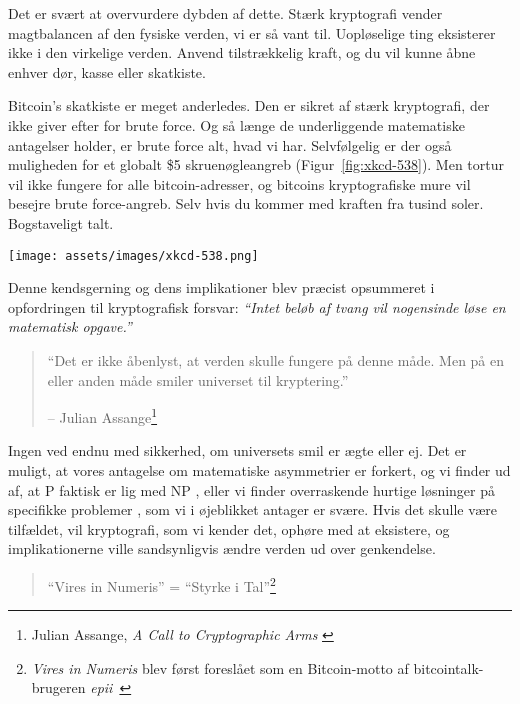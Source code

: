   
  Det er svært at overvurdere dybden af dette. Stærk kryptografi
  vender magtbalancen af den fysiske verden, vi er så vant til.
  Uopløselige ting eksisterer ikke i den virkelige verden. Anvend tilstrækkelig kraft,
  og du vil kunne åbne enhver dør, kasse eller skatkiste.
  
  Bitcoin's skatkiste er meget anderledes. Den er sikret af stærk
  kryptografi, der ikke giver efter for brute force. Og så længe de
  underliggende matematiske antagelser holder, er brute force alt, hvad vi har.
  Selvfølgelig er der også muligheden for et globalt \$5 skruenøgleangreb (Figur~\ref{fig:xkcd-538}).
  Men tortur vil ikke fungere for alle bitcoin-adresser, og bitcoins kryptografiske
  mure vil besejre brute force-angreb. Selv hvis du kommer med kraften fra tusind soler. Bogstaveligt talt.

\begin{center}
  \centering
  \texttt{[image: assets/images/xkcd-538.png]}
  \label{fig:xkcd-538}
\end{center}

Denne kendsgerning og dens implikationer blev præcist opsummeret i opfordringen
til kryptografisk forsvar: \textit{\enquote{Intet beløb af tvang vil nogensinde løse
en matematisk opgave.}}

\begin{quotation}\begin{samepage}
\enquote{Det er ikke åbenlyst, at verden skulle fungere på denne måde. Men på en eller anden måde smiler universet til kryptering.}
\begin{flushright} -- Julian Assange\footnote{Julian Assange, \textit{A Call to Cryptographic Arms} \cite{call-to-cryptographic-arms}}
\end{flushright}\end{samepage}\end{quotation}

Ingen ved endnu med sikkerhed, om universets smil er ægte eller ej. Det
er muligt, at vores antagelse om matematiske asymmetrier er forkert, og
vi finder ud af, at P faktisk er lig med NP \cite{wiki:pnp}, eller vi finder overraskende hurtige
løsninger på specifikke problemer \cite{wiki:discrete-log}, som vi i øjeblikket antager er svære.
Hvis det skulle være tilfældet, vil kryptografi, som vi kender det, ophøre med at
eksistere, og implikationerne ville sandsynligvis ændre verden ud over
genkendelse.

\begin{quotation}\begin{samepage}
\enquote{Vires in Numeris} = \enquote{Styrke i Tal}\footnote{\textit{Vires in Numeris} blev først foreslået som en Bitcoin-motto af bitcointalk-brugeren \textit{epii}~\cite{epii}}
\end{samepage}\end{quotation}

